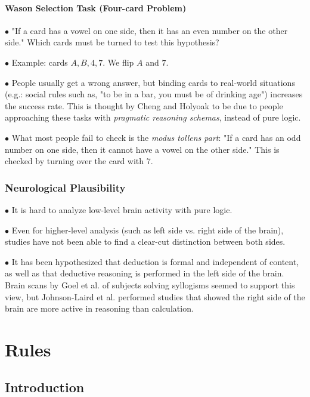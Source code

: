 \documentclass[english,openany]{book}
\begin{document}
\subsubsection{Wason Selection Task (Four-card Problem)}

$\bullet$ "If a card has a vowel on one side, then it has an even number on the other side." Which cards must be turned to test this hypothesis?

$\bullet$ Example: cards $A, B, 4, 7$. We flip $A$ and $7$.

$\bullet$ People usually get a wrong answer, but binding cards to real-world situations (e.g.: social rules such as, "to be in a bar, you must be of drinking age") increases the success rate. This is thought by Cheng and Holyoak to be due to people approaching these tasks with \textit{pragmatic reasoning schemas}, instead of pure logic.

$\bullet$ What most people fail to check is the \textit{modus tollens part}: "If a card has an odd number on one side, then it cannot have a vowel on the other side." This is checked by turning over the card with 7.

\subsection{Neurological Plausibility}

$\bullet$ It is hard to analyze low-level brain activity with pure logic.

$\bullet$ Even for higher-level analysis (such as left side vs. right side of the brain), studies have not been able to find a clear-cut distinction between both sides.

$\bullet$ It has been hypothesized that deduction is formal and independent of content, as well as that deductive reasoning is performed in the left side of the brain. Brain scans by Goel et al. of subjects solving syllogisms seemed to support this view, but Johnson-Laird et al. performed studies that showed the right side of the brain are more active in reasoning than calculation.

\chapter{Rules}

\section{Introduction}
\end{document}
